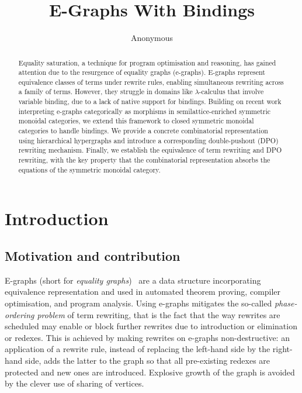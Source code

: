 \documentclass[]{IEEEtran}
\begin{document}
\title{E-Graphs With Bindings
}


\author{Anonymous}

\maketitle

\begin{abstract}
    Equality saturation, a technique for program optimisation and reasoning, has gained attention due to the resurgence of equality graphs (e-graphs). 
	E-graphs represent equivalence classes of terms under rewrite rules, enabling simultaneous rewriting across a family of terms. 
	However, they struggle in domains like $\lambda$-calculus that involve variable binding, due to a lack of native support for bindings.
	Building on recent work interpreting e-graphs categorically as morphisms in semilattice-enriched symmetric monoidal categories, we extend this framework to closed symmetric monoidal categories to handle bindings. 
	We provide a concrete combinatorial representation using hierarchical hypergraphs and introduce a corresponding double-pushout (DPO) rewriting mechanism. 
	Finally, we establish the equivalence of term rewriting and DPO rewriting, with the key property that the combinatorial representation absorbs the equations of the symmetric monoidal category.
\end{abstract}

\section{Introduction}
\label{sec:introduction}

\subsection{Motivation and contribution}

E-graphs (short for \emph{equality graphs})~\cite{EggPaper} are a data structure incorporating equivalence representation and used in automated theorem proving, compiler optimisation, and program analysis. 
Using e-graphs mitigates the so-called \emph{phase-ordering problem} of term rewriting, that is the fact that the way rewrites are scheduled may enable or block further rewrites due to introduction or elimination or redexes. 
This is achieved by making rewrites on e-graphs non-destructive: an application of a rewrite rule, instead of replacing the left-hand side by the right-hand side, adds the latter to the graph so that all pre-existing redexes are protected and new ones are introduced. 
Explosive growth of the graph is avoided by the clever use of sharing of vertices. 
\end{document}
